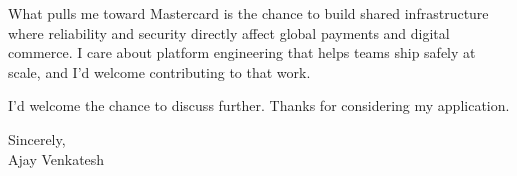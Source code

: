 \documentclass[letterpaper,11pt]{article}
\begin{document}
What pulls me toward Mastercard is the chance to build shared infrastructure where reliability and security directly affect global payments and digital commerce. I care about platform engineering that helps teams ship safely at scale, and I'd welcome contributing to that work.

I'd welcome the chance to discuss further. Thanks for considering my application.

\vspace{12pt}
Sincerely, \\
Ajay Venkatesh
\end{document}
